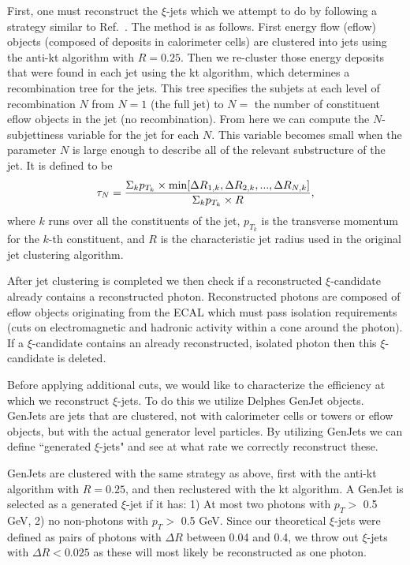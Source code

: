 \documentclass[letter,12pt]{article}
\begin{document}
First, one must reconstruct the $\xi$-jets which we attempt to do by following a strategy similar to Ref.~\cite{photon_jets}. The method is as follows. First energy flow (eflow) objects\cite{particleflow} (composed of deposits in calorimeter cells) are clustered into jets using the anti-kt algorithm with $R = 0.25$. Then we re-cluster those energy deposits that were found in each jet using the kt algorithm, which determines a recombination tree for the jets. This tree specifies the subjets at each level of recombination $N$ from $N = 1$ (the full jet) to $N =$ the number of constituent eflow objects in the jet (no recombination). From here we can compute the $N$-subjettiness variable for the jet for each $N$. This variable becomes small when the parameter $N$ is large enough to describe all of the relevant substructure of the jet. It is defined to be
\begin{equation}
\tau_{N} = \frac{\Sigma_{k} p_{T_{k}} \times {\rm min}[\Delta R_{1,k},\Delta R_{2,k}, . . . , \Delta R_{N,k}]}{\Sigma_{k}p_{T_{k}} \times R},
\end{equation}
where $k$ runs over all the constituents of the jet, $p_{T_{k}}$ is the transverse momentum for the $k$-th constituent, and $R$ is the characteristic jet radius used in the original jet clustering algorithm. 

After jet clustering is completed we then check if a reconstructed $\xi$-candidate already contains a reconstructed photon. Reconstructed photons are composed of eflow objects originating from the ECAL which must pass isolation requirements (cuts on electromagnetic and hadronic activity within a cone around the photon). If a $\xi$-candidate contains an already reconstructed, isolated photon then this $\xi$-candidate is deleted. 

Before applying additional cuts, we would like to characterize the efficiency at which we reconstruct $\xi$-jets. To do this we utilize Delphes GenJet objects. GenJets are jets that are clustered, not with calorimeter cells or towers or eflow objects, but with the actual generator level particles. By utilizing GenJets we can define ``generated $\xi$-jets" and see at what rate we correctly reconstruct these.

GenJets are clustered with the same strategy as above, first with the anti-kt algorithm with $R = 0.25$, and then reclustered with the kt algorithm. A GenJet is selected as a generated $\xi$-jet if it has: 1) At most two photons with  $p_T>$ 0.5 GeV, 2) no non-photons with $p_T >$ 0.5 GeV. Since our theoretical $\xi$-jets were defined as pairs of photons with $\Delta R$ between 0.04 and 0.4, we throw out $\xi$-jets with $\Delta R < 0.025$ as these will most likely be reconstructed as one photon. 
\end{document}
